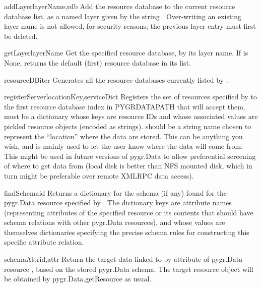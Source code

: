\documentclass{howto}
\begin{document}
\begin{funcdesc}{addLayer}{layerName,rdb}
  Add the resource database  to the current resource database list,
  as a named layer given by the string .  Over-writing an 
  existing layer name is not allowed, for security reasons; 
  the previous layer entry must first be deleted.
\end{funcdesc}

\begin{funcdesc}{getLayer}{layerName}
  Get the specified resource database, by its layer name.  If 
  is None, returns the default (first) resource database in its list.
\end{funcdesc}

\begin{funcdesc}{resourceDBiter}{}
  Generates all the resource databases currently listed by .
\end{funcdesc}

\begin{funcdesc}{registerServer}{locationKey,serviceDict}
  Registers the set of resources specified by  to the
  first resource database index in PYGRDATAPATH that will accept them.
   must be a dictionary whose keys are resource IDs and
  whose associated values are pickled resource objects (encoded as strings).
   should be a string name chosen to represent the ``location''
  where the data are stored.  This can be anything you wish, and is mainly used
  to let the user know where the data will come from.  This might be used
  in future versions of pygr.Data to allow preferential screening of where
  to get data from (local disk is better than NFS mounted disk, which in turn
  might be preferable over remote XMLRPC data access).
\end{funcdesc}

\begin{funcdesc}{findSchema}{id}
  Returns a dictionary for the schema (if any) found for the pygr.Data resource 
  specified by .  The dictionary keys are attribute names (representing
  attributes of the specified resource or its contents that should have 
  schema relations with other pygr.Data resources), and whose values are
  themselves dictionaries specifying the precise schema rules for constructing
  this specific attribute relation.
\end{funcdesc}

\begin{funcdesc}{schemaAttr}{id,attr}
  Return the target data linked to by attribute  of pygr.Data
  resource , based on the stored pygr.Data schema.  The target resource
  object will be obtained by pygr.Data.getResource as usual.
\end{funcdesc}
\end{document}

